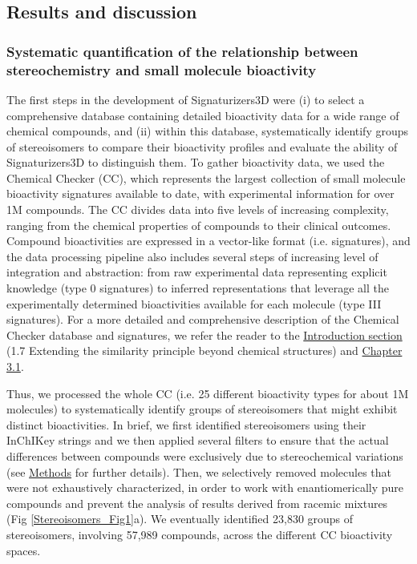 \subsection{Results and discussion}



\subsubsection{Systematic quantification of the relationship between stereochemistry and small molecule bioactivity}
\label{Stereoisomers_Rel_Stereo_Bioactivity}


The first steps in the development of Signaturizers3D were (i) to select a comprehensive database containing detailed bioactivity data for a wide range of chemical compounds, and (ii) within this database, systematically identify groups of stereoisomers to compare their bioactivity profiles and evaluate the ability of Signaturizers3D to distinguish them.
To gather bioactivity data, we used the Chemical Checker (CC), which represents the largest collection of small molecule bioactivity signatures available to date, with experimental information for over 1M compounds\cite{duran-frigola_extending_2020}. The CC divides data into five levels of increasing complexity, ranging from the chemical properties of compounds to their clinical outcomes. Compound bioactivities are expressed in a vector-like format (i.e. signatures), and the data processing pipeline also includes several steps of increasing level of integration and abstraction: from raw experimental data representing explicit knowledge (type 0 signatures) to inferred representations that leverage all the experimentally determined bioactivities available for each molecule (type III signatures). For a more detailed and comprehensive description of the Chemical Checker database and signatures, we refer the reader to the \hyperref[Introduction_extending]{Introduction section} (1.7 Extending the similarity principle beyond chemical structures) and \hyperref[Chapter_3.1]{Chapter 3.1}.

Thus, we processed the whole CC (i.e. 25 different bioactivity types for about 1M molecules) to systematically identify groups of stereoisomers that might exhibit distinct bioactivities. In brief, we first identified stereoisomers using their InChIKey strings and we then applied several filters to ensure that the actual differences between compounds were exclusively due to stereochemical variations (see \hyperref[Stereoisomers_Methods]{Methods} for further details). Then, we selectively removed molecules that were not exhaustively characterized, in order to work with enantiomerically pure compounds and prevent the analysis of results derived from racemic mixtures (Fig \ref{Stereoisomers_Fig1}a). We eventually identified 23,830 groups of stereoisomers, involving 57,989 compounds, across the different CC bioactivity spaces. 

